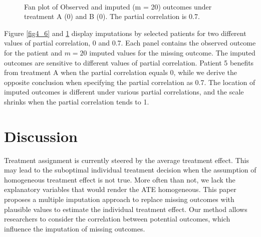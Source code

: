 \begin{figure}[ht!]
\begin{center}
{{				}
			}\\
		\end{center}
		\caption{Fan plot of Observed and imputed (m = 20) outcomes under treatment A (0) and B (0). The partial correlation is 0.7.}
		\label{fig4_7}
	\end{figure}
	Figure \ref{fig4_6} and \ref{fig4_7} display imputations by selected patients for two different values of partial correlation, 0 and 0.7. Each panel contains the observed outcome for the patient and $m = 20$ imputed values for the missing outcome. The imputed outcomes are sensitive to different values of partial correlation. Patient 5 benefits from treatment A when the partial correlation equals 0, while we derive the opposite conclusion when specifying the partial correlation as 0.7. The location of imputed outcomes is different under various partial correlations, and the scale shrinks when the partial correlation tends to 1.  
	
	\section{Discussion}
	\label{sec:4.7}
	Treatment assignment is currently steered by the average treatment effect. This may lead to the suboptimal individual treatment decision when the assumption of homogeneous treatment effect is not true. More often than not, we lack the explanatory variables that would render the ATE homogeneous. This paper proposes a multiple imputation approach to replace missing outcomes with plausible values to estimate the individual treatment effect. Our method allows researchers to consider the correlation between potential outcomes, which influence the imputation of missing outcomes.  
	
